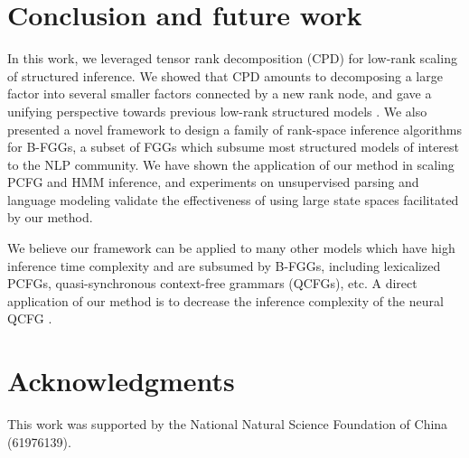 \documentclass[11pt]{article}
\begin{document}
\section{Conclusion and future work}
In this work, we leveraged tensor rank decomposition (CPD) for low-rank scaling of structured inference. We showed that CPD amounts to decomposing a large factor into several smaller factors connected by a new rank node, and gave a unifying perspective towards previous low-rank structured models \cite{yang-etal-2021-pcfgs, chiu2021low}.  We also presented a novel framework to design a family of rank-space inference algorithms for B-FGGs, a subset of FGGs which subsume most structured models of interest to the NLP community. We have shown the application of our method in scaling PCFG and HMM inference, and experiments on unsupervised parsing and language modeling validate the effectiveness of using large state spaces facilitated by our method. 

We believe our framework can be applied to many other models which have high inference time complexity and are subsumed by B-FGGs, including lexicalized PCFGs, quasi-synchronous context-free grammars (QCFGs), etc. A direct application of our method is to decrease the   inference complexity of the neural QCFG \cite{kim2021sequence}. 


\section*{Acknowledgments}
This work was supported by the National Natural Science Foundation of China (61976139).













\appendix
\end{document}
